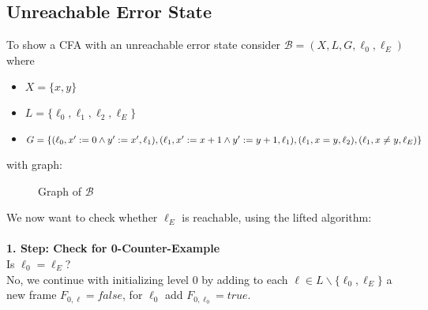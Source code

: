 \documentclass[11pt, a4paper, BCOR=10mm, ngerman, oneside]{scrbook}
\begin{document}
\pagebreak

\subsection{Unreachable Error State}
To show a CFA with an unreachable error state consider $\mathcal{B} = (X, L, G, \ell_0, \ell_E)$ where
\begin{itemize}
\item $X = \{x, y\}$
\item $L = \{\ell_0, \ell_1, \ell_2, \ell_E\}$
\item $G = \{(\ell_0, x' := 0 \land y' := x', \ell_1), (\ell_1, x' := x+1 \land y' := y+1, \ell_1),\\ (\ell_1, x = y, \ell_2), (\ell_1, x \neq y, \ell_E) \}$
\end{itemize}

with graph: \\


\begin{figure}[H]
\centering
\hspace*{3cm}
  \caption{Graph of $\mathcal{B}$}
 \end{figure}
 \label{ex1} 

We now want to check whether $\ell_E$ is reachable, using the lifted algorithm: \\ \\

\textbf{1. Step: Check for 0-Counter-Example} \\
Is $\ell_0 = \ell_E$? \\
No, we continue with initializing level 0 by adding to each $\ell \in L \backslash \{\ell_0, \ell_E\}$ a new frame $F_{0, \ell} = false$, for $\ell_0$ add $F_{0, \ell_0} = true$. \\ \\
\end{document}
